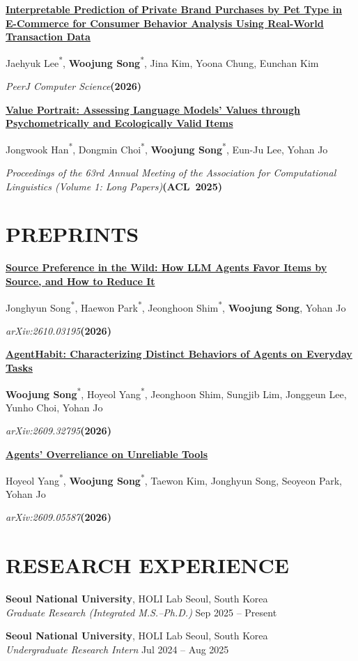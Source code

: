 \documentclass[a4paper,10pt]{extarticle}
\newcommand{\publication}[5]{%
    \par\addvspace{8pt}\noindent
    \begin{minipage}{\linewidth}
        \raggedright
        \textbf{\href{#2}{#1}}\par
        #5\par
        \textit{#3}\enspace\mbox{\textbf{(#4)}}\par
    \end{minipage}\par
}
\begin{document}
\publication
{Interpretable Prediction of Private Brand Purchases by Pet Type in E-Commerce for Consumer Behavior Analysis Using Real-World Transaction Data}
{https://peerj.com/articles/cs-3795/}
{PeerJ Computer Science}
{2026}
{Jaehyuk Lee\textsuperscript{*}, \textbf{Woojung Song}\textsuperscript{*}, Jina Kim, Yoona Chung, Eunchan Kim}

\publication
{Value Portrait: Assessing Language Models' Values through Psychometrically and Ecologically Valid Items}
{https://aclanthology.org/2025.acl-long.838/}
{Proceedings of the 63rd Annual Meeting of the Association for Computational Linguistics (Volume 1: Long Papers)}
{ACL~2025}
{Jongwook Han\textsuperscript{*}, Dongmin Choi\textsuperscript{*}, \textbf{Woojung Song}\textsuperscript{*}, Eun-Ju Lee, Yohan Jo}

\newpage
\section*{PREPRINTS}

\publication
{Source Preference in the Wild: How LLM Agents Favor Items by Source, and How to Reduce It}
{https://arxiv.org/abs/2610.03195}
{arXiv:2610.03195}
{2026}
{Jonghyun Song\textsuperscript{*}, Haewon Park\textsuperscript{*}, Jeonghoon Shim\textsuperscript{*}, \textbf{Woojung Song}, Yohan Jo}

\publication
{AgentHabit: Characterizing Distinct Behaviors of Agents on Everyday Tasks}
{https://arxiv.org/abs/2609.32795}
{arXiv:2609.32795}
{2026}
{\textbf{Woojung Song}\textsuperscript{*}, Hoyeol Yang\textsuperscript{*}, Jeonghoon Shim, Sungjib Lim, Jonggeun Lee, Yunho Choi, Yohan Jo}

\publication
{Agents' Overreliance on Unreliable Tools}
{https://arxiv.org/abs/2609.05587}
{arXiv:2609.05587}
{2026}
{Hoyeol Yang\textsuperscript{*}, \textbf{Woojung Song}\textsuperscript{*}, Taewon Kim, Jonghyun Song, Seoyeon Park, Yohan Jo}

\section*{RESEARCH EXPERIENCE}
\noindent
\textbf{Seoul National University}, HOLI Lab \hfill Seoul, South Korea\\
\textit{Graduate Research (Integrated M.S.--Ph.D.)} \hfill Sep 2025 -- Present

\medskip
\noindent
\textbf{Seoul National University}, HOLI Lab \hfill Seoul, South Korea\\
\textit{Undergraduate Research Intern} \hfill Jul 2024 -- Aug 2025
\end{document}
